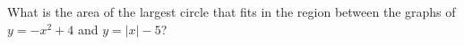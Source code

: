 What is the area of the largest circle that fits in the region between the graphs of $y=-x^2+4$ and $y=|x|-5$?
